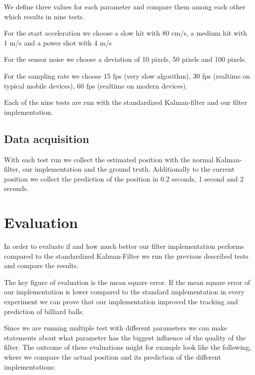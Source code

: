 \documentclass[titlepage, a4paper, 11pt]{scrartcl}
\begin{document}
        We define three values for each parameter and compare them among each other which results in nine tests.

        For the start acceleration we choose a slow hit with 80 cm/s, a medium hit with 1 m/s and a power shot with 4 m/s \cite{ballspeed}

        For the sensor noise we choose a deviation of 10 pixels, 50 pixels and 100 pixels.

        For the sampling rate we choose 15 fps (very slow algorithm), 30 fps (realtime on typical mobile devices), 60 fps (realtime on modern devices).

        Each of the nine tests are run with the standardized Kalman-filter and our filter implementation.

        \subsection{Data acquisition}

        With each test run we collect the estimated position with the normal Kalman-filter, our implementation and the ground truth.
        Additionally to the current position we collect the prediction of the position in 0.2 seconds, 1 second and 2 seconds.

    \section{Evaluation}

    In order to evaluate if and how much better our filter implementation performs compared to the standardized Kalman-Filter
    we run the previous described tests and compare the results.

    The key figure of evaluation is the mean square error.
    If the mean square error of our implementation is lower compared to the standard implementation in every experiment 
    we can prove that our implementation improved the tracking and prediction of billiard balls.

    Since we are running multiple test with different parameters we can make statements about what parameter has the biggest influence of the quality of the filter. 
    The outcome of these evaluations might for example look like the following, where we compare the actual position and its prediction of the different implementations:
\end{document}
